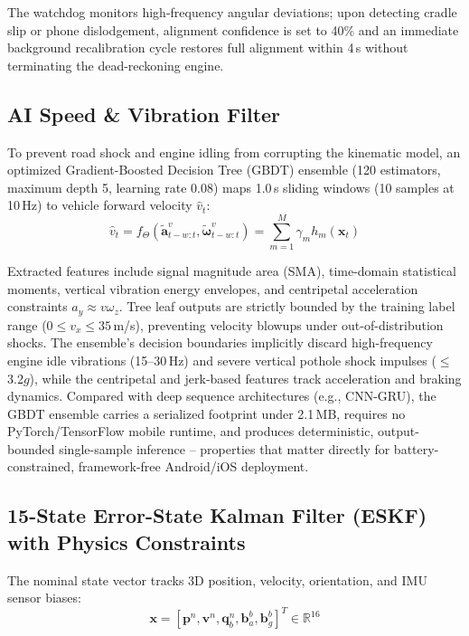 \documentclass[conference]{IEEEtran}
\begin{document}
The watchdog monitors high-frequency angular deviations; upon detecting cradle slip or phone dislodgement, alignment confidence is set to 40\% and an immediate background recalibration cycle restores full alignment within 4\,s without terminating the dead-reckoning engine.

\subsection{AI Speed \& Vibration Filter}

To prevent road shock and engine idling from corrupting the kinematic model, an optimized Gradient-Boosted Decision Tree (GBDT) ensemble (120 estimators, maximum depth 5, learning rate 0.08) maps 1.0\,s sliding windows (10 samples at 10\,Hz) to vehicle forward velocity $\hat{v}_t$:
\begin{equation}
\hat{v}_t = f_{\Theta}\left(\tilde{\mathbf{a}}^v_{t-w:t}, \tilde{\boldsymbol{\omega}}^v_{t-w:t}\right) = \sum_{m=1}^{M} \gamma_m h_m(\mathbf{x}_t)
\end{equation}

Extracted features include signal magnitude area (SMA), time-domain statistical moments, vertical vibration energy envelopes, and centripetal acceleration constraints $a_y \approx v\omega_z$. Tree leaf outputs are strictly bounded by the training label range ($0 \leq v_x \leq 35$\,m/s), preventing velocity blowups under out-of-distribution shocks. The ensemble's decision boundaries implicitly discard high-frequency engine idle vibrations (15--30\,Hz) and severe vertical pothole shock impulses ($\leq$3.2$g$), while the centripetal and jerk-based features track acceleration and braking dynamics. Compared with deep sequence architectures (e.g., CNN-GRU), the GBDT ensemble carries a serialized footprint under 2.1\,MB, requires no PyTorch/TensorFlow mobile runtime, and produces deterministic, output-bounded single-sample inference -- properties that matter directly for battery-constrained, framework-free Android/iOS deployment.

\subsection{15-State Error-State Kalman Filter (ESKF) with Physics Constraints}

The nominal state vector tracks 3D position, velocity, orientation, and IMU sensor biases:
\begin{equation}
\mathbf{x} = \left[\mathbf{p}^n, \mathbf{v}^n, \mathbf{q}_b^n, \mathbf{b}_a^b, \mathbf{b}_g^b\right]^T \in \mathbb{R}^{16}
\end{equation}
\end{document}

